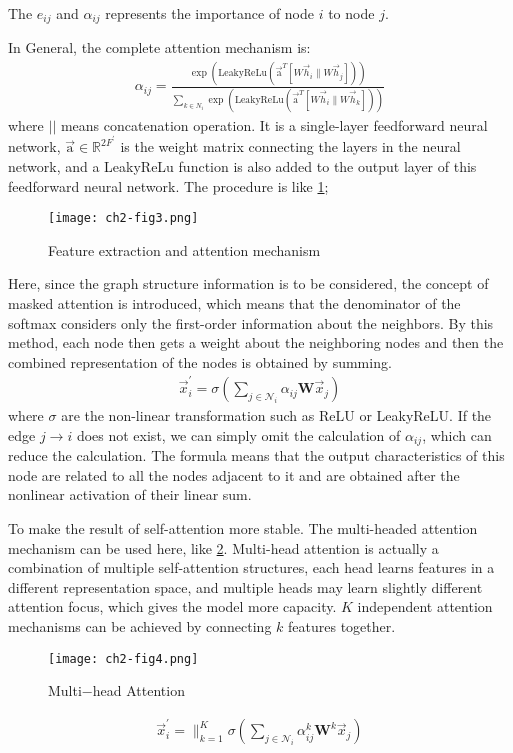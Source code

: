 The \(e_{ij}\) and \(\alpha_{ij}\) represents the importance of node \(i\) to node \(j\).

In General, the complete attention mechanism is:
\begin{align}
	\alpha_{i j}=\frac{\exp (\text{LeakyReLu}(\overrightarrow{\mathrm{a}}^{T}[W \vec{h}_{i} \| W \vec{h}_{j}]))}{\sum_{k \in N_{i}} \exp (\text{LeakyReLu}(\overrightarrow{\mathrm{a}}^{T}[W \vec{h}_{i} \| W \vec{h}_{k}]))}
\end{align}
where $||$ means concatenation operation. It is a single-layer feedforward neural network, \(\overrightarrow{\mathrm{a} } \in \mathbb{R}^{2F^{\prime}}\) is the weight matrix connecting the layers in the neural network, and a LeakyReLu function is also added to the output layer of this feedforward neural network. The procedure is like \figurename{\ref{fig:ch3-fig3}};

\begin{figure}[h]
	\centering
	\texttt{[image: ch2-fig3.png]}
	\caption{Feature extraction and attention mechanism}\label{fig:ch3-fig3}
\end{figure}

Here, since the graph structure information is to be considered, the concept of masked attention is introduced, which means that the denominator of the softmax considers only the first-order information about the neighbors. By this method, each node then gets a weight about the neighboring nodes and then the combined representation of the nodes is obtained by summing.
\begin{align}
	\vec{x}_{i}^{\prime}=\sigma(\sum_{j \in \mathcal{N}_{i}} \alpha_{i j} \mathbf{W} \vec{x}_{j})
\end{align}
where \(\sigma \) are the non-linear transformation such as ReLU or LeakyReLU. If the edge \(j \to i\) does not exist, we can simply omit the calculation of \(\alpha_{ij}\), which can reduce the calculation. The formula means that the output characteristics of this node are related to all the nodes adjacent to it and are obtained after the nonlinear activation of their linear sum.

To make the result of self-attention more stable. The multi-headed attention mechanism can be used here, like \figurename{\ref{fig:ch3-fig4}}. Multi-head attention is actually a combination of multiple self-attention structures, each head learns features in a different representation space, and multiple heads may learn slightly different attention focus, which gives the model more capacity.
\(K\) independent attention mechanisms can be achieved by connecting \(k\) features together.
\begin{figure}[h]
	\centering
	\texttt{[image: ch2-fig4.png]}
	\caption{Multi−head Attention}\label{fig:ch3-fig4}
\end{figure}
\begin{align}
	\vec{x}_{i}^{\prime}=\|_{k=1}^{K} \sigma(\sum_{j \in \mathcal{N}_{i}} \alpha_{i j}^{k} \mathbf{W}^{k} \vec{x}_{j})
\end{align}



